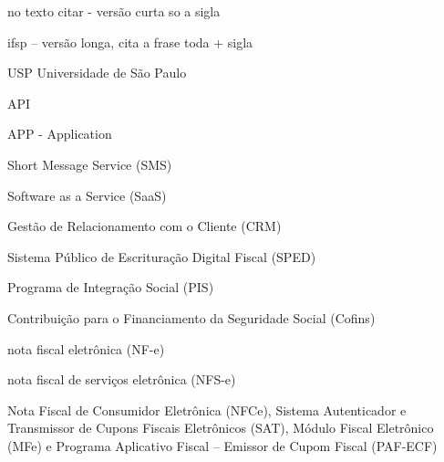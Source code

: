 

\ifdef{\printnoidxglossary}{
    \printnoidxglossary[type=\acronymtype,title=Lista de abreviaturas e siglas,style=siglas]
    \cleardoublepage
}{}







no texto citar \acs{}- versão curta so a sigla

\ac{ifsp} -- versão longa, cita a frase toda + sigla


USP  Universidade de São Paulo

API

APP - Application

Short Message Service (SMS)

Software as a Service (SaaS)

Gestão de Relacionamento com o Cliente (CRM)

Sistema Público de Escrituração Digital Fiscal (SPED)

Programa de Integração Social (PIS)

Contribuição para o Financiamento da Seguridade Social (Cofins)

nota fiscal eletrônica (NF-e)

nota fiscal de serviços eletrônica (NFS-e)

Nota Fiscal de Consumidor Eletrônica (NFCe), Sistema Autenticador e Transmissor de Cupons Fiscais Eletrônicos (SAT), Módulo Fiscal Eletrônico (MFe) e Programa Aplicativo Fiscal – Emissor de Cupom Fiscal (PAF-ECF)

